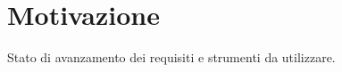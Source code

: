 \documentclass[../Riunione16-01-07.tex]{subfiles}
\begin{document}
\section{Motivazione}
Stato di avanzamento dei requisiti e strumenti da utilizzare.
\end{document}
